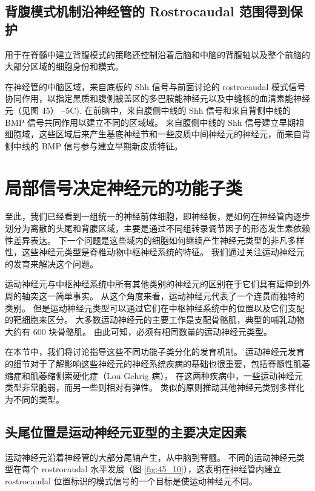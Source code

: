 \subsection{背腹模式机制沿神经管的 Rostrocaudal 范围得到保护}
用于在脊髓中建立背腹模式的策略还控制沿着后脑和中脑的背腹轴以及整个前脑的大部分区域的细胞身份和模式。

在神经管的中脑区域，来自底板的 Shh 信号与前面讨论的 rostrocaudal 模式信号协同作用，以指定黑质和腹侧被盖区的多巴胺能神经元以及中缝核的血清素能神经元（见图 45） –5C). 在前脑中，来自腹侧中线的 Shh 信号和来自背侧中线的 BMP 信号共同作用以建立不同的区域域。 来自腹侧中线的 Shh 信号建立早期祖细胞域，这些区域后来产生基底神经节和一些皮质中间神经元的神经元，而来自背侧中线的 BMP 信号参与建立早期新皮质特征。


\section{局部信号决定神经元的功能子类}
至此，我们已经看到一组统一的神经前体细胞，即神经板，是如何在神经管内逐步划分为离散的头尾和背腹区域，主要是通过不同组转录调节因子的形态发生素依赖性差异表达。 下一个问题是这些域内的细胞如何继续产生神经元类型的非凡多样性，这些神经元类型是脊椎动物中枢神经系统的特征。 我们通过关注运动神经元的发育来解决这个问题。

运动神经元与中枢神经系统中所有其他类别的神经元的区别在于它们具有延伸到外周的轴突这一简单事实。 从这个角度来看，运动神经元代表了一个连贯而独特的类别。 但是运动神经元类型可以通过它们在中枢神经系统中的位置以及它们支配的靶细胞来区分。 大多数运动神经元的主要工作是支配骨骼肌，典型的哺乳动物大约有 600 块骨骼肌。 由此可知，必须有相同数量的运动神经元类型。

在本节中，我们将讨论指导这些不同功能子类分化的发育机制。 运动神经元发育的细节对于了解影响这些神经元的神经系统疾病的基础也很重要，包括脊髓性肌萎缩症和肌萎缩侧索硬化症（Lou Gehrig 病）。 在这两种疾病中，一些运动神经元类型非常脆弱，而另一些则相对有弹性。 类似的原则推动其他神经元类别多样化为不同的类型。

\subsection{头尾位置是运动神经元亚型的主要决定因素}
运动神经元沿着神经管的大部分尾轴产生，从中脑到脊髓。 
不同的运动神经元类型在每个 rostrocaudal 水平发展（图 \ref{fig:45_10}），这表明在神经管内建立 rostrocaudal 位置标识的模式信号的一个目标是使运动神经元不同。

